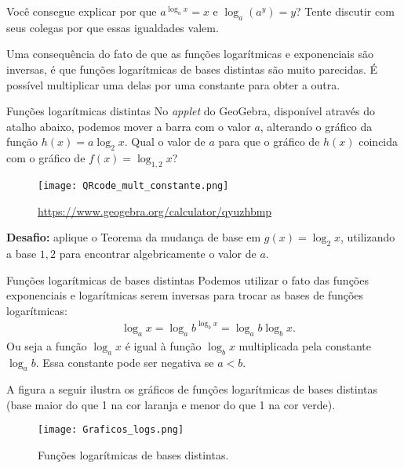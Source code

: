 \begin{reflection}
Você consegue explicar por que $a^{\log_a x}=x$ e $\log_a (a^y) = y$? Tente discutir com seus colegas por que essas igualdades valem.
\end{reflection}


Uma consequência do fato de que as funções logarítmicas e exponenciais são inversas, é que funções logarítmicas de bases distintas são muito parecidas. É possível multiplicar uma delas por uma constante para obter a outra.

\vspace{-1em}
\begin{task}{Funções logarítmicas distintas}
No \textit{applet} do GeoGebra, disponível através do atalho abaixo, podemos mover a barra com o valor $a$, alterando o gráfico da função $h(x) = a \log_2 x$. Qual o valor de $a$ para que o gráfico de $h(x)$ coincida com o gráfico de $f(x) = \log_{1{,}2} x$?


\begin{figure}[H]
\centering

\texttt{[image: QRcode\_mult\_constante.png]}

\url{https://www.geogebra.org/calculator/qyuzhbmp}
\end{figure}

\textbf{Desafio:} aplique o Teorema da mudança de base em $g(x)= \log_2 x$, utilizando a base $1{,}2$ para encontrar algebricamente o valor de $a$.
\end{task}


\begin{observation}{Funções logarítmicas de bases distintas}
Podemos utilizar o fato das funções exponenciais e logarítmicas serem inversas para trocar as bases de funções logarítmicas:
\begin{align*}
&\log_a x = \log_a b^{\log_b x} =\log_a b\log_b x.
\end{align*}
Ou seja a função $\log_a x$ é igual à função $\log_b x$ multiplicada pela constante $\log_a b$. Essa constante pode ser negativa se $a<b$.
\end{observation}

A figura a seguir ilustra os gráficos de funções logarítmicas de bases distintas (base maior do que 1 na cor laranja e menor do que 1 na cor verde).

\begin{figure}[!htb]
\centering
\texttt{[image: Graficos\_logs.png]}
\caption{Funções logarítmicas de bases distintas.}
\end{figure}


